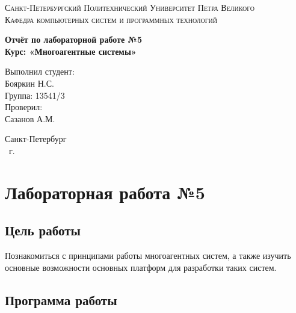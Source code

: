 \documentclass[14pt,a4paper,report]{report}
\begin{document}
\def\contentsname{Содержание}

\begin{titlepage}
	\begin{center}
		\textsc{Санкт-Петербургский Политехнический 
			Университет Петра Великого\\[5mm]
			Кафедра компьютерных систем и программных технологий}
		
		\vfill
		
		\textbf{Отчёт по лабораторной работе №5\\[3mm]
			Курс: «Многоагентные системы»\\[41mm]
		}
	\end{center}
	
	\hfill
	\begin{minipage}{.4\textwidth}
		Выполнил студент:\\[2mm] 
		Бояркин Н.С.\\
		Группа: 13541/3\\[5mm]
		
		Проверил:\\[2mm] 
		Сазанов А.М.
	\end{minipage}
	\vfill
	\begin{center}
		Санкт-Петербург\\ \the\year\ г.
	\end{center}
\end{titlepage}

\tableofcontents
\clearpage

\chapter{Лабораторная работа №5}

\section{Цель работы}

Познакомиться с принципами работы многоагентных систем, а также изучить основные возможности основных платформ для разработки таких систем.

\section{Программа работы}
\end{document}
